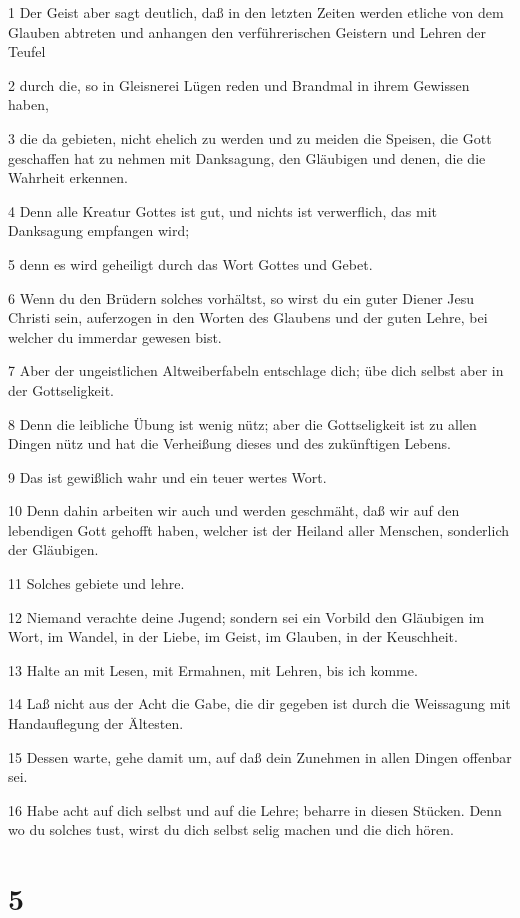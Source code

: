 \par 1 Der Geist aber sagt deutlich, daß in den letzten Zeiten werden etliche von dem Glauben abtreten und anhangen den verführerischen Geistern und Lehren der Teufel
\par 2 durch die, so in Gleisnerei Lügen reden und Brandmal in ihrem Gewissen haben,
\par 3 die da gebieten, nicht ehelich zu werden und zu meiden die Speisen, die Gott geschaffen hat zu nehmen mit Danksagung, den Gläubigen und denen, die die Wahrheit erkennen.
\par 4 Denn alle Kreatur Gottes ist gut, und nichts ist verwerflich, das mit Danksagung empfangen wird;
\par 5 denn es wird geheiligt durch das Wort Gottes und Gebet.
\par 6 Wenn du den Brüdern solches vorhältst, so wirst du ein guter Diener Jesu Christi sein, auferzogen in den Worten des Glaubens und der guten Lehre, bei welcher du immerdar gewesen bist.
\par 7 Aber der ungeistlichen Altweiberfabeln entschlage dich; übe dich selbst aber in der Gottseligkeit.
\par 8 Denn die leibliche Übung ist wenig nütz; aber die Gottseligkeit ist zu allen Dingen nütz und hat die Verheißung dieses und des zukünftigen Lebens.
\par 9 Das ist gewißlich wahr und ein teuer wertes Wort.
\par 10 Denn dahin arbeiten wir auch und werden geschmäht, daß wir auf den lebendigen Gott gehofft haben, welcher ist der Heiland aller Menschen, sonderlich der Gläubigen.
\par 11 Solches gebiete und lehre.
\par 12 Niemand verachte deine Jugend; sondern sei ein Vorbild den Gläubigen im Wort, im Wandel, in der Liebe, im Geist, im Glauben, in der Keuschheit.
\par 13 Halte an mit Lesen, mit Ermahnen, mit Lehren, bis ich komme.
\par 14 Laß nicht aus der Acht die Gabe, die dir gegeben ist durch die Weissagung mit Handauflegung der Ältesten.
\par 15 Dessen warte, gehe damit um, auf daß dein Zunehmen in allen Dingen offenbar sei.
\par 16 Habe acht auf dich selbst und auf die Lehre; beharre in diesen Stücken. Denn wo du solches tust, wirst du dich selbst selig machen und die dich hören.

\chapter{5}

